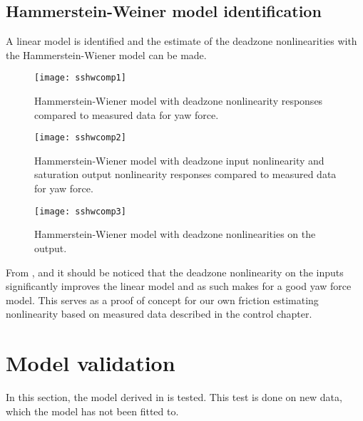 \newpage
\subsection{Hammerstein-Weiner model identification}

A linear model is identified and the estimate of the deadzone nonlinearities with the Hammerstein-Wiener model can be made.


\begin{figure}[H]
\centering
\hspace{-2.5em}\texttt{[image: sshwcomp1]}
\caption{Hammerstein-Wiener model with deadzone nonlinearity responses compared to measured data for yaw force.}
\label{fig:2LMI}
\end{figure}

\begin{figure}[H]
\centering
\hspace{-2.5em}\texttt{[image: sshwcomp2]}
\caption{Hammerstein-Wiener model with deadzone input nonlinearity and saturation output nonlinearity responses compared to measured data for yaw force.}
\label{fig:2LMI1}
\end{figure}

\begin{figure}[H]
\centering
\hspace{-2.5em}\texttt{[image: sshwcomp3]}
\caption{Hammerstein-Wiener model with deadzone nonlinearities on the output.}
\label{fig:2LMI2}
\end{figure}

From ,  and  it should be noticed that the deadzone nonlinearity on the inputs significantly improves the linear model and as such makes for a good yaw force model.
This serves as a proof of concept for our own friction estimating nonlinearity based on measured data described in the control chapter.

\section{Model validation} \label{se:mdval}
In this section, the model derived in  is tested. This test is done on new data, which the model has not been fitted to.


